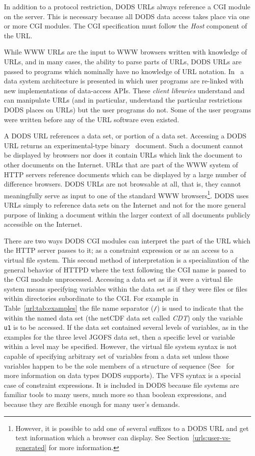 In addition to a protocol restriction, DODS URLs always reference a CGI
module on the server. This is necessary because all DODS data access takes
place via one or more CGI modules. The CGI specification must follow the {\em
Host\/} component of the URL\@.

While WWW URLs are the input to WWW browsers written with knowledge of URLs,
and in many cases, the ability to parse parts of URLs, DODS URLs are passed to
programs which nominally have no knowledge of URL notation. In \DDA\ a data
system architecture is presented in which user programs are re-linked with
new implementations of data-access APIs. These {\em client libraries\/}
understand and can manipulate URLs (and in particular, understand the
particular restrictions DODS places on URLs) but the user programs do
not. Some of the user programs were written before any of the URL software
even existed. 

A DODS URL references a data set, or portion of a data set. Accessing a DODS
URL returns an experimental-type binary \MIME\ document. Such a document
cannot be displayed by browsers nor does it contain URLs which link the
document to other documents on the Internet. URLs that are part of the WWW
system of HTTP servers reference documents which can be displayed by a large
number of difference browsers. DODS URLs are not browsable at all, that is,
they cannot meaningfully serve as input to one of the standard WWW
browsers\footnote{However, it is possible to add one of several suffixes to a
DODS URL and get text information which a browser can display. See
Section~\ref{urls:user-vs-generated} for more information.}. DODS uses URLs
simply to reference data sets on the Internet and not for the more general
purpose of linking a document within the larger context of all documents
publicly accessible on the Internet.

There are two ways DODS CGI modules can interpret the part of the URL which
the HTTP server passes to it; as a constraint expression or as an access to a
virtual file system. This second method of interpretation is a specialization
of the general behavior of HTTPD where the text following the CGI name is
passed to the CGI module unprocessed. Accessing a data set as if it were a
virtual file system means specifying variables within the data set as if they
were files or files within directories subordinate to the CGI\@. For example in
Table~\ref{url:tab:examples} the file name separator ({\tt /}) is used to
indicate that the within the named data set (the netCDF data set called {\em
  CDT\/}) only the variable {\tt u1} is to be accessed. If the data set
contained several levels of variables, as in the examples for the three level
JGOFS data set, then a specific level or variable within a level may be
specified.  However, the virtual file system syntax is not capable of
specifying arbitrary set of variables from a data set unless those variables
happen to be the sole members of a structure of sequence (See \DTP\ for more
information on data types DODS supports). The VFS syntax is a special case of
constraint expressions. It is included in DODS because file systems are
familiar tools to many users, much more so than boolean expressions, and
because they are flexible enough for many user's demands.

